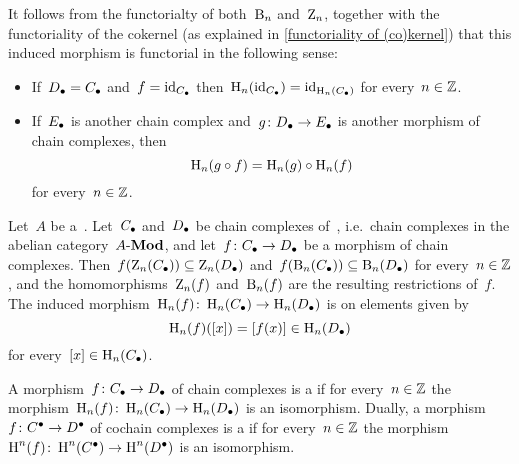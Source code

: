 \begin{remark}
  It follows from the functorialty of both~$\operatorname{B}_n$ and~$\operatorname{Z}_n$, together with the functoriality of the cokernel (as explained in \cref{functoriality of (co)kernel}) that this induced morphism is functorial in the following sense:
  \begin{itemize}
    \item
      If~$D_\bullet = C_\bullet$ and~$f = \operatorname{id}_{C_\bullet}$ then~$\operatorname{H}_n(\operatorname{id}_{C_\bullet}) = \operatorname{id}_{\operatorname{H}_n(C_\bullet)}$ for every~$n \in \mathbb{Z}$.
    \item
      If~$E_\bullet$ is another chain complex and~$g \colon D_\bullet \to E_\bullet$ is another morphism of chain complexes, then
      \[
          \operatorname{H}_n(g \circ f)
        = \operatorname{H}_n(g) \circ \operatorname{H}_n(f)
      \]
      for every~$n \in \mathbb{Z}$.
  \end{itemize}
\end{remark}


\begin{example*}
  Let~$A$ be a~{\kalg}.
  Let~$C_\bullet$ and~$D_\bullet$ be chain complexes of~{}, i.e.\ chain complexes in the abelian category~$\text{$A$-$\mathbf{Mod}$}$, and let~$f \colon C_\bullet \to D_\bullet$ be a morphism of chain complexes.
  Then~$f(\operatorname{Z}_n(C_\bullet)) \subseteq \operatorname{Z}_n(D_\bullet)$ and~$f(\operatorname{B}_n(C_\bullet)) \subseteq \operatorname{B}_n(D_\bullet)$ for every~$n \in \mathbb{Z}$, and the homomorphisms~$\operatorname{Z}_n(f)$ and~$\operatorname{B}_n(f)$ are the resulting restrictions of~$f$.
  The induced morphism~$\operatorname{H}_n(f) \colon \operatorname{H}_n(C_\bullet) \to \operatorname{H}_n(D_\bullet)$ is on elements given by
  \[
        \operatorname{H}_n(f)( [x] )
    =   [f(x)]
    \in \operatorname{H}_n(D_\bullet)
  \]
  for every~$[x] \in \operatorname{H}_n(C_\bullet)$.
\end{example*}


\begin{definition}
  A morphism~$f \colon C_\bullet \to D_\bullet$ of chain complexes is a \emph{{\qim}} if for every~$n \in \mathbb{Z}$ the morphism~$\operatorname{H}_n(f) \colon \operatorname{H}_n(C_\bullet) \to \operatorname{H}_n(D_\bullet)$ is an isomorphism.
  Dually, a morphism~$f \colon C^\bullet \to D^\bullet$ of cochain complexes is a \emph{{\qim}} if for every~$n \in \mathbb{Z}$ the morphism~$\operatorname{H}^n(f) \colon \operatorname{H}^n(C^\bullet) \to \operatorname{H}^n(D^\bullet)$ is an isomorphism.
\end{definition}


